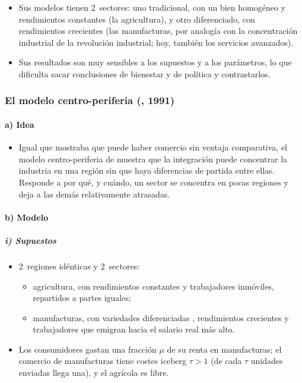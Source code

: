 \documentclass[11pt]{article}
\begin{document}
\begin{itemize}
\begin{itemize}
  \end{itemize}
\item Sus modelos tienen 2~sectores: uno tradicional, con un bien homogéneo y rendimientos constantes (la agricultura), y otro diferenciado, con rendimientos crecientes (las manufacturas, por analogía con la concentración industrial de la revolución industrial; hoy, también los servicios avanzados).
\item Sus resultados son muy sensibles a los supuestos y a los parámetros, lo que dificulta sacar conclusiones de bienestar y de política y contrastarlos.
\end{itemize}

\subsubsection{El modelo centro-periferia (, 1991)}\label{sec:centro-periferia}

\paragraph{a) Idea}

\begin{itemize}
\item Igual que \textcite{Krugman1979Increasing} mostraba que puede haber comercio sin ventaja comparativa, el modelo centro-periferia de \textcite{Krugman1991Increasing} muestra que la integración puede concentrar la industria en una región sin que haya diferencias de partida entre ellas. Responde a por qué, y cuándo, un sector se concentra en pocas regiones y deja a las demás relativamente atrasadas.
\end{itemize}

\paragraph{b) Modelo}

\subparagraph{i) Supuestos}

\begin{itemize}
\item 2~regiones idénticas y 2~sectores:
  \begin{itemize}
  \item agricultura, con rendimientos constantes y trabajadores inmóviles, repartidos a partes iguales;
  \item manufacturas, con variedades diferenciadas , rendimientos crecientes y trabajadores que emigran hacia el salario real más alto.
  \end{itemize}
\item Los consumidores gastan una fracción $\mu$ de su renta en manufacturas; el comercio de manufacturas tiene costes iceberg $\tau>1$ (de cada $\tau$ unidades enviadas llega una), y el agrícola es libre.
\end{itemize}
\end{document}
